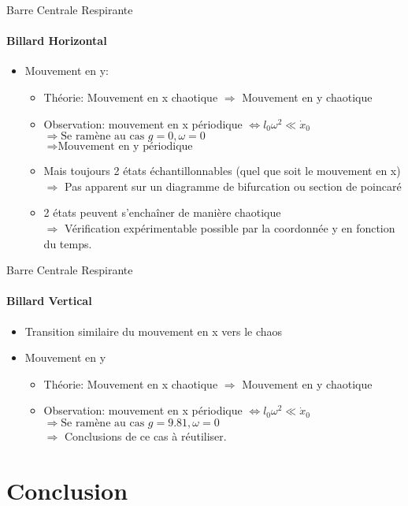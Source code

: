 \documentclass{beamer}
\begin{document}
  \begin{frame}{Barre Centrale Respirante}
  \framesubtitle{Billard Horizontal}
  \begin{itemize}
    \item Mouvement en y:
    \begin{itemize}
      \item Théorie: Mouvement en x chaotique \( \Rightarrow \) Mouvement en y chaotique
      \item Observation: mouvement en x périodique \( \Leftrightarrow l_0 \omega ^ 2 \ll \dot{x}_0 \)\\ \( \Rightarrow \text{Se ramène au cas } g=0, \omega =0\) \\ \( \Rightarrow \text{Mouvement en y périodique} \)
      \pause \item Mais toujours 2 états échantillonnables (quel que soit le mouvement en x)\\\(\Rightarrow\) Pas apparent sur un diagramme de bifurcation ou section de poincaré
      \item 2 états peuvent s'enchaîner de manière chaotique\\\(\Rightarrow\) Vérification expérimentable possible par la coordonnée y en fonction du temps.
    \end{itemize}
  \end{itemize}
  \end{frame}
  
    \begin{frame}{Barre Centrale Respirante}
  \framesubtitle{Billard Vertical}
  \begin{itemize}
    \item Transition similaire du mouvement en x vers le chaos
    \item Mouvement en y
    \begin{itemize}
      \item Théorie: Mouvement en x chaotique \( \Rightarrow \) Mouvement en y chaotique
      \item Observation: mouvement en x périodique \( \Leftrightarrow l_0 \omega ^ 2 \ll \dot{x}_0 \)\\ \( \Rightarrow \text{Se ramène au cas } g=9.81, \omega =0\)\\
      \( \Rightarrow\) Conclusions de ce cas à réutiliser.
    \end{itemize}
  \end{itemize}
  \end{frame}
  
  \section{Conclusion}
  
\end{document}
